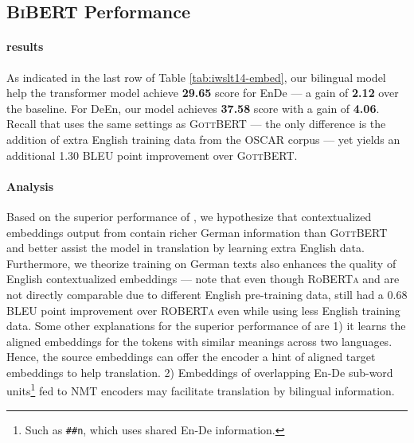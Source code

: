 \documentclass[11pt]{article}
\begin{document}
\subsection{\textsc{BiBERT} Performance}
\paragraph{ results} 
As indicated in the last row of Table \ref{tab:iwslt14-embed}, our bilingual model help the transformer model achieve \textbf{29.65} score for EnDe --- a gain of \textbf{2.12} over the baseline. For DeEn, our model achieves \textbf{37.58} score with a gain of \textbf{4.06}.  Recall that  uses the same settings as \textsc{GottBERT} --- the only difference is the addition of extra English training data from the OSCAR corpus --- yet
 yields an additional 1.30 BLEU point improvement over \textsc{GottBERT}.

\paragraph{Analysis}
Based on the superior performance of , we hypothesize that contextualized embeddings output from  contain richer German information than \textsc{GottBERT} and better assist the model in translation by learning extra English data. Furthermore, we theorize training on German texts also enhances the quality of English contextualized embeddings --- note that even though \textsc{RoBERTa} and  are not directly comparable due to different English pre-training data,  still had a 0.68 BLEU point improvement over \textsc{ROBERTa} even while using less English training data. Some other explanations for the superior performance of  are 1) it learns the aligned embeddings for the tokens with similar meanings across two languages. Hence, the source embeddings can offer the encoder a hint of aligned target embeddings to help translation. 2) Embeddings of overlapping En-De sub-word units\footnote{Such as \texttt{\#\#n}, which uses shared En-De information.} fed to NMT encoders may facilitate translation by bilingual information. 
\end{document}
